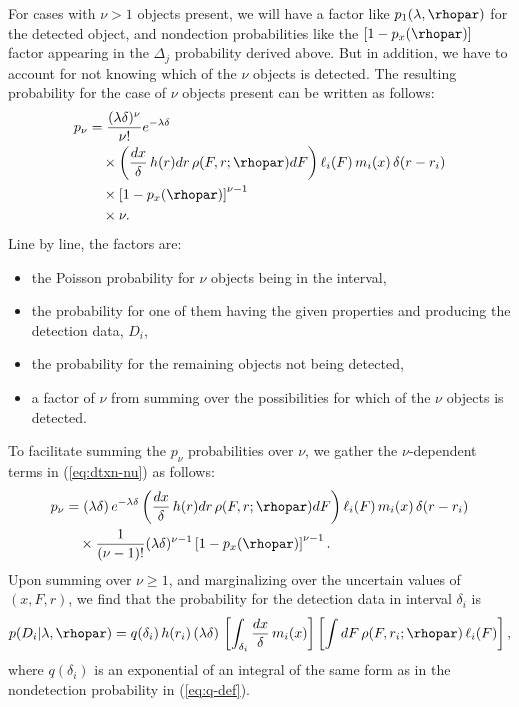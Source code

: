 For cases with $\nu > 1$ objects present, we will have a factor like $p_1(\lambda,\rhopar)$ for the detected object, and nondection probabilities like the $[1 - p_x(\rhopar)]$ factor appearing in the $\Delta_j$ probability derived above.
But in addition, we have to account for not knowing which of the $\nu$ objects is detected.
The resulting probability for the case of $\nu$ objects present can be written as follows:
\begin{equation}\label{eq:dtxn-nu}
\begin{split}
p_\nu
  &= \frac{(\lambda\delta)^\nu}{\nu!}  e^{-\lambda\delta}\\
  &\quad \times \left(\frac{dx}{\delta}\, h(r)dr\, \rho(F,r;\rhopar)dF\right) \ell_i(F)\, m_i(x)\, \delta(r - r_i) \\
  &\quad \times \left[1 - p_x(\rhopar)\right]^{\nu-1}\\
  &\quad \times \nu.
\end{split}
\end{equation}
Line by line, the factors are:
\begin{itemize}
\item the Poisson probability for $\nu$ objects being in the interval,
\item the probability for one of them having the given properties and
producing the detection data, $D_i$,
\item the probability for the remaining objects not being detected,
\item a factor of $\nu$ from summing over the possibilities for
which of the $\nu$ objects is detected.
\end{itemize}
To facilitate summing the $p_\nu$ probabilities over $\nu$, we gather the $\nu$-dependent terms in (\ref{eq:dtxn-nu}) as follows:
\begin{equation}\label{eq:dtxn-nu2}
\begin{split}
p_\nu
  &= (\lambda\delta)\,  e^{-\lambda\delta}
  \left(\frac{dx}{\delta}\, h(r)dr\, \rho(F,r;\rhopar)dF\right) \ell_i(F)\, m_i(x)\, \delta(r - r_i) \\
  &\quad \times \frac{1}{(\nu-1)!}(\lambda\delta)^{\nu-1}
    \left[1 - p_x(\rhopar)\right]^{\nu-1}.
\end{split}
\end{equation}
Upon summing over $\nu \ge 1$, and marginalizing over the uncertain values of $(x,F,r)$, we find that the probability for the detection data in interval $\delta_i$ is
\begin{equation}\label{eq:p-dtxn}
p(D_i|\lambda,\rhopar) =
  q(\delta_i)\, h(r_i)\, (\lambda\delta)\,
  \left[\int_{\delta_i}\frac{dx}{\delta}\, m_i(x)\right]
  \left[\int dF\, \rho(F,r_i;\rhopar)\, \ell_i(F)\right],
\end{equation}
where $q(\delta_i)$ is an exponential of an integral of the same form as in the nondetection probability in (\ref{eq:q-def}).

